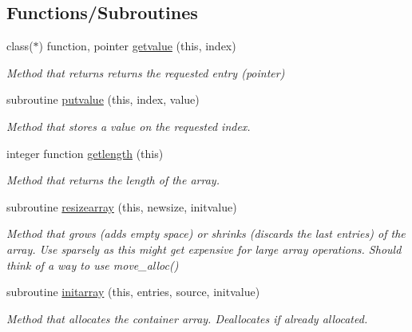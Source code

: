 \subsection*{Functions/\+Subroutines}
\begin{DoxyCompactItemize}
\item 
class($\ast$) function, pointer \mbox{\hyperlink{namespaceabstract__container__array__mod_a2b3e0aec504d76c73bf7f18158924af4}{getvalue}} (this, index)
\begin{DoxyCompactList}\small\item\em Method that returns returns the requested entry (pointer) \end{DoxyCompactList}\item 
subroutine \mbox{\hyperlink{namespaceabstract__container__array__mod_aae1f6309c51e282a528ce78f128443e0}{putvalue}} (this, index, value)
\begin{DoxyCompactList}\small\item\em Method that stores a value on the requested index. \end{DoxyCompactList}\item 
integer function \mbox{\hyperlink{namespaceabstract__container__array__mod_a22d71ca3f03bf0bb5d3737338e5e349a}{getlength}} (this)
\begin{DoxyCompactList}\small\item\em Method that returns the length of the array. \end{DoxyCompactList}\item 
subroutine \mbox{\hyperlink{namespaceabstract__container__array__mod_adb5b2e1692fa90a0239e9a0bcdc7967d}{resizearray}} (this, newsize, initvalue)
\begin{DoxyCompactList}\small\item\em Method that grows (adds empty space) or shrinks (discards the last entries) of the array. Use sparsely as this might get expensive for large array operations. Should think of a way to use move\+\_\+alloc() \end{DoxyCompactList}\item 
subroutine \mbox{\hyperlink{namespaceabstract__container__array__mod_a793ed0fff6fc6c5823f1e7f119f44959}{initarray}} (this, entries, source, initvalue)
\begin{DoxyCompactList}\small\item\em Method that allocates the container array. Deallocates if already allocated. \end{DoxyCompactList}\end{DoxyCompactItemize}
